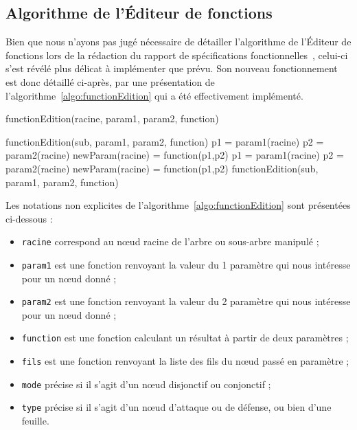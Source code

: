 \subsection{Algorithme de l'Éditeur de fonctions}
\label{ssec:editeurFct}

Bien que nous n'ayons pas jugé nécessaire de détailler l'algorithme de l'Éditeur de fonctions lors de la rédaction du rapport de spécifications fonctionnelles~\cite{spec_fonc}, celui-ci s'est révélé plus délicat à implémenter que prévu. Son nouveau fonctionnement est donc détaillé ci-après, par une présentation de l'{\sc algorithme}~\ref{algo:functionEdition} qui a été effectivement implémenté.

	\begin{algorithm}[H]
            \caption{functionEdition(racine, param1, param2, function)}
            \label{algo:functionEdition}
            \begin{algorithmic}
				\STATE functionEdition(sub, param1, param2, function)
			\ENDFOR
			\RETURN
		\ENDIF
		\STATE
			\STATE p1 = param1(racine)
			\STATE p2 = param2(racine)
			\STATE newParam(racine) = function(p1,p2)
			\RETURN
		\ELSE
					\STATE p1 = param1(racine)
					\STATE p2 = param2(racine)
					\STATE newParam(racine) = function(p1,p2)
				\ENDIF
				\STATE functionEdition(sub, param1, param2, function)
			\ENDFOR
		\ENDIF
            \end{algorithmic}
        \end{algorithm}

 Les notations non explicites de l'{\sc algorithme}~\ref{algo:functionEdition} sont présentées ci-dessous :
        \begin{itemize}
            \item \verb|racine| correspond au nœud racine de l'arbre ou sous-arbre manipulé ;
            \item \verb|param1| est une fonction renvoyant la valeur du 1\ier{} paramètre qui nous intéresse pour un nœud donné ;
            \item \verb|param2| est une fonction renvoyant la valeur du 2\ieme{} paramètre qui nous intéresse pour un nœud donné ;
            \item \verb|function| est une fonction calculant un résultat à partir de deux paramètres ;
            \item \verb|fils| est une fonction renvoyant la liste des fils du nœud passé en paramètre ;
            \item \verb|mode| précise si il s'agit d'un nœud disjonctif ou conjonctif ;
            \item \verb|type| précise si il s'agit d'un nœud d'attaque ou de défense, ou bien d'une feuille.
        \end{itemize}

